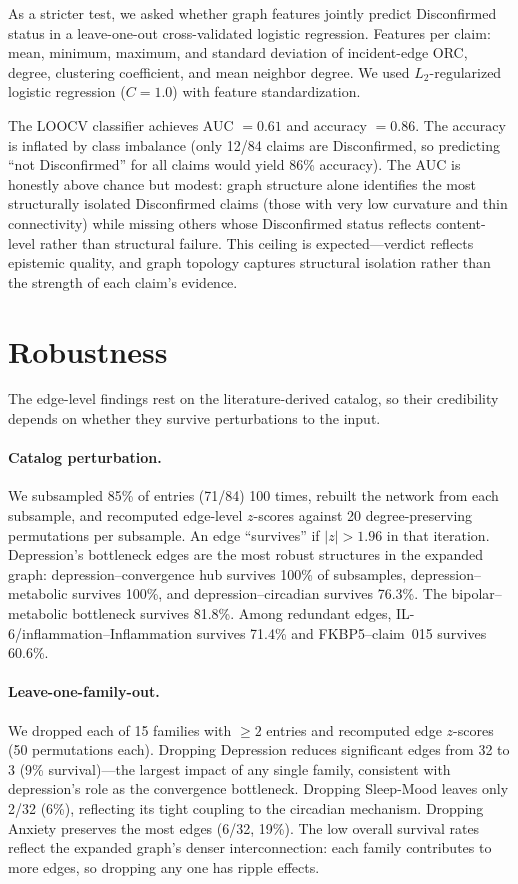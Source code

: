 \documentclass{article}
\begin{document}
As a stricter test, we asked whether graph features jointly predict Disconfirmed status in a leave-one-out cross-validated logistic regression. Features per claim: mean, minimum, maximum, and standard deviation of incident-edge ORC, degree, clustering coefficient, and mean neighbor degree. We used $L_2$-regularized logistic regression ($C = 1.0$) with feature standardization.

The LOOCV classifier achieves AUC $= 0.61$ and accuracy $= 0.86$. The accuracy is inflated by class imbalance (only 12/84 claims are Disconfirmed, so predicting ``not Disconfirmed'' for all claims would yield 86\% accuracy). The AUC is honestly above chance but modest: graph structure alone identifies the most structurally isolated Disconfirmed claims (those with very low curvature and thin connectivity) while missing others whose Disconfirmed status reflects content-level rather than structural failure. This ceiling is expected---verdict reflects epistemic quality, and graph topology captures structural isolation rather than the strength of each claim's evidence.

\section{Robustness}
\label{sec:robustness}

The edge-level findings rest on the literature-derived catalog, so their credibility depends on whether they survive perturbations to the input.

\paragraph{Catalog perturbation.} We subsampled 85\% of entries (71/84) 100 times, rebuilt the network from each subsample, and recomputed edge-level $z$-scores against 20 degree-preserving permutations per subsample. An edge ``survives'' if $|z| > 1.96$ in that iteration. Depression's bottleneck edges are the most robust structures in the expanded graph: depression--convergence hub survives 100\% of subsamples, depression--metabolic survives 100\%, and depression--circadian survives 76.3\%. The bipolar--metabolic bottleneck survives 81.8\%. Among redundant edges, IL-6/inflammation--Inflammation survives 71.4\% and FKBP5--claim~015 survives 60.6\%.

\paragraph{Leave-one-family-out.} We dropped each of 15 families with $\geq 2$ entries and recomputed edge $z$-scores (50 permutations each). Dropping Depression reduces significant edges from 32 to 3 (9\% survival)---the largest impact of any single family, consistent with depression's role as the convergence bottleneck. Dropping Sleep-Mood leaves only 2/32 (6\%), reflecting its tight coupling to the circadian mechanism. Dropping Anxiety preserves the most edges (6/32, 19\%). The low overall survival rates reflect the expanded graph's denser interconnection: each family contributes to more edges, so dropping any one has ripple effects.
\end{document}
